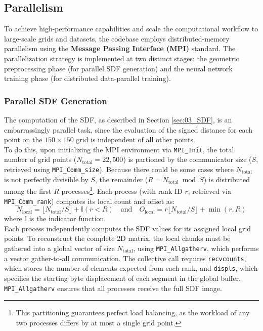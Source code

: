 \subsection{Parallelism}
\label{sec:03_parallelism}

To achieve high-performance capabilities and scale the computational workflow to large-scale grids and datasets, the codebase employs distributed-memory parallelism using the \textbf{Message Passing Interface (MPI)} standard. The parallelization strategy is implemented at two distinct stages: the geometric preprocessing phase (for parallel SDF generation) and the neural network training phase (for distributed data-parallel training).

\subsubsection{Parallel SDF Generation}

The computation of the SDF, as described in Section \ref{sec:03_SDF}, is an embarrassingly parallel task, since the evaluation of the signed distance for each point on the $150 \times 150$ grid is independent of all other points.\\

To do this, upon initializing the MPI environment via \texttt{MPI\_Init}, the total number of grid points ($N_{\text{total}} = 22,500$) is partioned by the communicator size ($S$, retrieved using \texttt{MPI\_Comm\_size}). Because there could be some cases where $N_{\text{total}}$ is not perfectly divisible by $S$, the remainder ($R = N_{\text{total}} \bmod S$) is distributed among the first $R$ processes\footnote{This partitioning guarantees perfect load balancing, as the workload of any two processes differs by at most a single grid point.}. Each process (with rank ID $r$, retrieved via \texttt{MPI\_Comm\_rank}) computes its local count and offset as:
\begin{equation}
    N_{\text{local}} = \lfloor N_{\text{total}} / S \rfloor + \mathbb{I}(r < R)\quad\text{and}\quad O_{\text{local}} = r \lfloor N_{\text{total}} / S \rfloor + \min(r, R)
\end{equation}
where $\mathbb{I}$ is the indicator function.\\

Each process independently computes the SDF values for its assigned local grid points. To reconstruct the complete 2D matrix, the local chunks must be gathered into a global vector of size $N_{\text{total}}$, using \texttt{MPI\_Allgatherv}, which performs a vector gather-to-all communication. The collective call requires \texttt{recvcounts}, which stores the number of elements expected from each rank, and \texttt{displs}, which specifies the starting byte displacement of each segment in the global buffer. \texttt{MPI\_Allgatherv} ensures that all processes receive the full SDF image.\\

